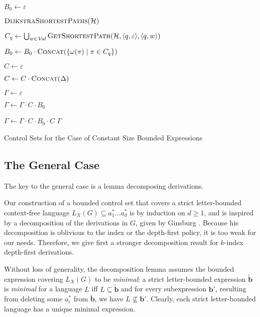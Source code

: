 \documentclass[final]{llncs}
\def\tuple#1{{\langle #1 \rangle}}
\def\len#1{{\vert{#1}\vert}}
\def\prod{\Delta}
\def\patt{{\widetilde{\mathbf{b}}}}
\begin{document}
\begin{algorithm}[thb]
{\begin{algorithmic}[1]
        \State $B_0 \leftarrow \varepsilon$

        \State \(\Call{DijkstraShortestPaths}{\mathcal{H}}\)
        \label{ln:dijkstra}

  \label{ln:b0-start}

	\State \(C_q \leftarrow \bigcup_{w\in\mathit{Val}}
        \Call{GetShortestPath}{\mathcal{H},\tuple{q,\varepsilon}, \tuple{q,w}} \)
        \label{ln:cq}

	\State $B_0 \leftarrow B_0 \cdot \Call{Concat}{\{\omega(\pi) \mid \pi \in C_q\} }$
        \label{ln:concat-cq}

  \EndFor\label{ln:b0-end}

  \State \(C \leftarrow \varepsilon\) 
  \label{ln:c-start}

  \For{\(i = 1 \ldots \len{G}^{2k}-1\)}
           \State \(C \leftarrow C \cdot \Call{Concat}{\prod}\)
           \label{ln:concat-prod}
  \EndFor\label{ln:c-end}

  \State $\Gamma \leftarrow \varepsilon$ 

  \For{$i = 1 \ldots \len{G}^{2k}$}\label{ln:pat-start}
  \State $\Gamma \leftarrow \Gamma \cdot C \cdot B_0$
  \EndFor\label{ln:pat-end}

  \State $\Gamma \leftarrow \Gamma \cdot C \cdot B_0 \cdot C$
   $\Gamma$
  \EndFunction
\end{algorithmic}
\caption{Control Sets for the Case of Constant Size Bounded Expressions}\label{alg:constant-control-set}
}
\end{algorithm}

\subsection{The General Case}\label{sec:bounded}

The key to the general case is a lemma decomposing derivations. 

 Our construction of a bounded control set that covers a strict
letter-bounded context-free language $L_X(G) \subseteq a_1^* \ldots
a_d^*$ is by induction on $d \geq 1$, and is inspired by a
decomposition of the derivations in $G$, given by
Ginsburg \cite[Chapter 5.3, Lemma 5.3.3]{ginsburg}. Because
his decomposition is oblivious to the index or the depth-first policy,
it is too weak for our needs. Therefore, we give first a stronger
decomposition result for \(k\)-index depth-first derivations. 


Without loss of generality, the decomposition lemma assumes the bounded
expression covering \(L_X(G)\) to be \emph{minimal}: a strict letter-bounded
expression \(\patt\) is \emph{minimal} for a language \(L\) if{}f \(L \subseteq
\patt\) and for every subexpression \(\mathbf{b}'\), resulting from deleting
some \(a_i^*\) from \(\patt\), we have \(L \nsubseteq \mathbf{b}'\).  Clearly,
each strict letter-bounded language has a unique minimal expression.
\end{document}

